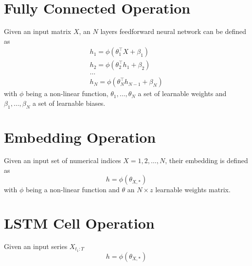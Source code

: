 \section{Fully Connected Operation}
Given an input matrix $X$, an $N$ layers feedforward neural network can be defined as
\begin{gather}
    \label{fnn_operation}
    h_1 = \phi(\theta_1^\top X + \beta_1)\\ \nonumber
    h_2 = \phi(\theta_2^\top h_1  + \beta_2)\\ \nonumber
    \dots\\ \nonumber
    h_N = \phi(\theta_N^\top h_{N-1}  + \beta_N) \nonumber
\end{gather}
with $\phi$ being a non-linear function, ${\theta_1, \dots, \theta_N}$ a set of learnable weights and ${\beta_1, \dots, \beta_N}$ a set of learnable biases.

\section{Embedding Operation}
Given an input set of numerical indices $X = {1, 2, \dots, N}$, their embedding is defined as 
\begin{equation}
    h = \phi(\theta_{X,*})
\end{equation}
with $\phi$ being a non-linear function and $\theta$ an $N \times z$ learnable weights matrix.

\section{LSTM Cell Operation}
Given an input series $X_{t_1:T}$
\begin{equation}
    h = \phi(\theta_{X,*})
\end{equation}


